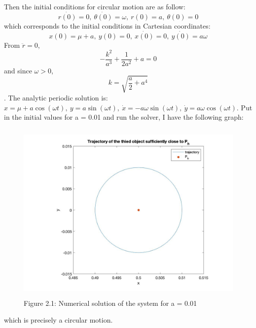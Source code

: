 \documentclass[11pt]{article}
\begin{document}
Then the initial conditions for circular motion are as follow:
$$\dot{r(0)} = 0,\ \dot{\theta(0)} = \omega,\ r(0) = a,\ \theta(0) = 0$$ which corresponds to the initial conditions in Cartesian coordinates:
$$x(0) = \mu+a,\ y(0) = 0,\ \dot{x(0)} = 0,\ \dot{y(0)} = a\omega $$
From $\ddot{r} = 0$, $$-\frac{k^{2}}{a^{3}}+\frac{1}{2a^{2}}+a = 0$$ and since $\omega>0$,
$$k = \sqrt{\frac{a}{2}+a^{4}}$$. 
The analytic periodic solution is: $x = \mu + a\cos(\omega t),\ y = a\sin(\omega t),\ \dot{x} = -a\omega\sin(\omega t),\ \dot{y} = a\omega\cos(\omega t)$.
\newline
Put in the initial values for a = 0.01 and run the solver, I have the following graph:
\begin{figure}[H]
\centering
\includegraphics[width = 12cm, height =9cm]{Q2.jpg}
\caption{Figure 2.1: Numerical solution of the system for a = 0.01}
\end{figure}
which is precisely a circular motion.
\end{document}
